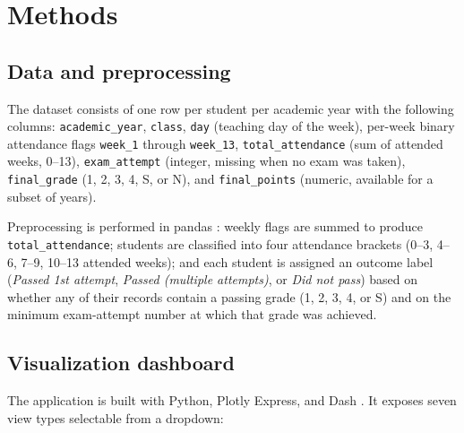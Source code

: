 \documentclass[final,3p,times,twocolumn]{elsarticle}
\begin{document}
\section{Methods}
\label{sec:methods}

\subsection{Data and preprocessing}

The dataset consists of one row per student per academic year with
the following columns: \texttt{academic\_year}, \texttt{class},
\texttt{day} (teaching day of the week), per-week binary attendance
flags \texttt{week\_1} through \texttt{week\_13},
\texttt{total\_attendance} (sum of attended weeks, 0--13),
\texttt{exam\_attempt} (integer, missing when no exam was taken),
\texttt{final\_grade} (1, 2, 3, 4, S, or N), and
\texttt{final\_points} (numeric, available for a subset of years).

Preprocessing is performed in pandas \cite{McKinney2010}:
weekly flags are summed to produce \texttt{total\_attendance};
students are classified into four attendance brackets
(0--3, 4--6, 7--9, 10--13 attended weeks);
and each student is assigned an outcome label
(\textit{Passed 1st attempt}, \textit{Passed (multiple attempts)},
or \textit{Did not pass}) based on whether any of their records
contain a passing grade (1, 2, 3, 4, or S) and on the minimum
exam-attempt number at which that grade was achieved.

\subsection{Visualization dashboard}

The application is built with Python, Plotly Express, and
Dash \cite{Plotly2015}.
It exposes seven view types selectable from a dropdown:
\end{document}
